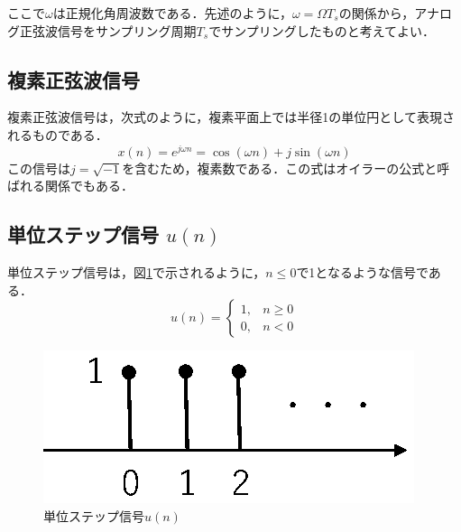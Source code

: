ここで$\omega$は正規化角周波数である．先述のように，$\omega=\Omega T_s$の関係から，アナログ正弦波信号をサンプリング周期$T_s$でサンプリングしたものと考えてよい．

\subsection{複素正弦波信号}

複素正弦波信号は，次式のように，複素平面上では半径1の単位円として表現されるものである．
\begin{equation}
x(n)=e^{j\omega n}=\cos (\omega n ) +j \sin (\omega n)
\end{equation}
この信号は$j=\sqrt{-1}$を含むため，複素数である．この式はオイラーの公式と呼ばれる関係でもある．

\subsection{単位ステップ信号 $u(n)$}

単位ステップ信号は，図\ref{fig:zu4-2-30}で示されるように，$n \leq 0$で1となるような信号である．
\begin{equation}
u(n) = \left \{ 
\begin{array}{cc}
1, & n \geq 0 \\
0, & n < 0
\end{array}
\right .
\end{equation}

\begin{figure}[H]
\begin{center}
\begin{minipage}{.48\textwidth}
\begin{center}
\includegraphics[width=.95\textwidth]{fig/zu-2-4-b.eps}

\end{center}
\end{minipage}

\end{center}
\caption{単位ステップ信号$u(n)$}
\label{fig:zu4-2-30}
\end{figure}



